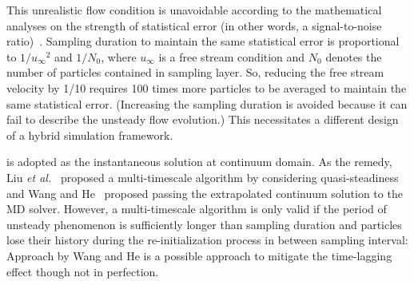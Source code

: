 \documentclass[preprint,12pt]{elsarticle}
\begin{document}
This unrealistic flow condition is unavoidable according to the mathematical analyses on the strength of statistical error (in other words, a signal-to-noise ratio)~\cite{Hadjicon3,Time_Mechanism}. Sampling duration to maintain the same statistical error is proportional to ${{1} / {{u}_{\infty}}^2}$ and ${{1} / {N_0}}$, where ${u_{\infty}}$ is a free stream condition and ${N_0}$ denotes the number of particles contained in sampling layer.
So, reducing the free stream velocity by 1/10 requires 100 times more particles to be averaged to maintain the same statistical error. (Increasing the sampling duration is avoided because it can fail to describe the unsteady flow evolution.) This necessitates a different design of a hybrid simulation framework.

is adopted as the instantaneous solution at continuum domain. As the remedy, Liu {\it{et al.}}~\cite{Liu} proposed a multi-timescale algorithm by considering quasi-steadiness and Wang and He~\cite{Wang} proposed passing the extrapolated continuum solution to the MD solver. However, a multi-timescale algorithm is only valid if the period of unsteady phenomenon is sufficiently longer than sampling duration and particles lose their history during the re-initialization process in between sampling interval: Approach by Wang and He is a possible approach to mitigate the time-lagging effect though not in perfection.
\end{document}
